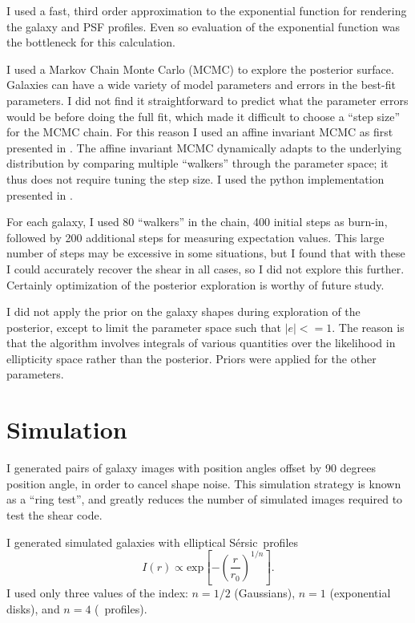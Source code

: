 \documentclass[12pt,preprint]{aastex}
\newcommand{\sersic}{S\'{e}rsic}
\begin{document}
I used a fast, third order approximation to the exponential function for
rendering the galaxy and PSF profiles.  Even so evaluation of the exponential
function was the bottleneck for this calculation.

I used a Markov Chain Monte Carlo (MCMC) to explore the posterior surface.
Galaxies can have a wide variety of model parameters and errors in the best-fit
parameters.  I did not find it straightforward to predict what the parameter
errors would be before doing the full fit, which made it difficult to choose a
``step size'' for the MCMC chain.  For this reason I used an affine invariant
MCMC as first presented in \citet{GoodmanWeare10}.  The affine invariant MCMC
dynamically adapts to the underlying distribution by comparing multiple
``walkers'' through the parameter space; it thus does not require tuning the
step size.  I used the python implementation presented in \citet{Mackey13}.

For each galaxy, I used 80 ``walkers'' in the chain, 400 initial steps as
burn-in, followed by 200 additional steps for measuring expectation values.
This large number of steps may be excessive in some situations, but I found
that with these I could accurately recover the shear in all cases, so I did not
explore this further.  Certainly optimization of the posterior exploration is
worthy of future study.

I did not apply the prior on the galaxy shapes during exploration of the
posterior, except to limit the parameter space such that $|e| <= 1$. The reason
is that the algorithm involves integrals of various quantities over the
likelihood in ellipticity space rather than the posterior.  Priors were applied
for the other parameters.


\section{Simulation} \label{sec:sim}

I generated pairs of galaxy images with position angles offset by 90 degrees
position angle, in order to cancel shape noise.  This simulation strategy is
known as a ``ring test''\citep{Nakajima2007}, and greatly reduces the number of
simulated images required to test the shear code.

I generated simulated galaxies with elliptical \sersic\ profiles \citep{Sersic63}
\begin{equation}
I(r) \varpropto \mathrm{exp} \left[ -\left( \frac{r}{r_0} \right)^{1/n} \right].
\end{equation}
I used only three values of the index: $n=1/2$ (Gaussians), $n=1$ (exponential
disks), and $n=4$ (\devauc\ profiles).
\end{document}
